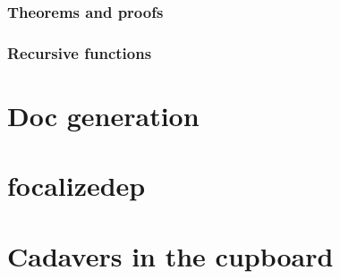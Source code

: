 \documentclass{book}
\begin{document}
\subsection{Theorems and proofs}
\subsection{Recursive functions}

\chapter{Doc generation}

\chapter{focalizedep}

\chapter{Cadavers in the cupboard}


\printindex
\end{document}
